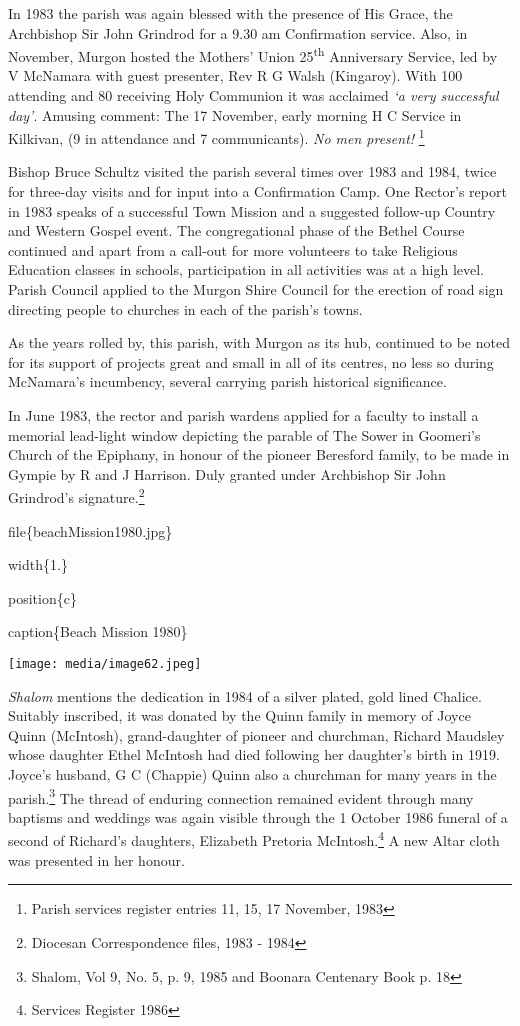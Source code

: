 In 1983 the parish was again blessed with the presence of His Grace, the Archbishop Sir John Grindrod for a 9.30 am Confirmation service. Also, in November, Murgon hosted the Mothers' Union 25\textsuperscript{th} Anniversary Service, led by V McNamara with guest presenter, Rev R G Walsh (Kingaroy). With 100 attending and 80 receiving Holy Communion it was acclaimed \emph{`a very successful day'}. Amusing comment: The 17 November, early morning H C Service in Kilkivan, (9 in attendance and 7 communicants). \emph{No men present!} \footnote{Parish services register entries 11, 15, 17 November, 1983}

Bishop Bruce Schultz visited the parish several times over 1983 and 1984, twice for three-day visits and for input into a Confirmation Camp. One Rector's report in 1983 speaks of a successful Town Mission and a suggested follow-up Country and Western Gospel event. The congregational phase of the Bethel Course continued and apart from a call-out for more volunteers to take Religious Education classes in schools, participation in all activities was at a high level. Parish Council applied to the Murgon Shire Council for the erection of road sign directing people to churches in each of the parish's towns.

As the years rolled by, this parish, with Murgon as its hub, continued to be noted for its support of projects great and small in all of its centres, no less so during McNamara's incumbency, several carrying parish historical significance.

In June 1983, the rector and parish wardens applied for a faculty to install a memorial lead-light window depicting the parable of The Sower in Goomeri's Church of the Epiphany, in honour of the pioneer Beresford family, to be made in Gympie by R and J Harrison. Duly granted under Archbishop Sir John Grindrod's signature.\footnote{Diocesan Correspondence files, 1983 - 1984}

file\{beachMission1980.jpg\}

width\{1.\}

position\{c\}

caption\{Beach Mission 1980\}

\texttt{[image: media/image62.jpeg]}

\emph{Shalom} mentions the dedication in 1984 of a silver plated, gold lined Chalice. Suitably inscribed, it was donated by the Quinn family in memory of Joyce Quinn (McIntosh), grand-daughter of pioneer and churchman, Richard Maudsley whose daughter Ethel McIntosh had died following her daughter's birth in 1919. Joyce's husband, G C (Chappie) Quinn also a churchman for many years in the parish.\footnote{Shalom, Vol 9, No. 5, p. 9, 1985 and Boonara Centenary Book p. 18} The thread of enduring connection remained evident through many baptisms and weddings was again visible through the 1 October 1986 funeral of a second of Richard's daughters, Elizabeth Pretoria McIntosh.\footnote{Services Register 1986} A new Altar cloth was presented in her honour.


